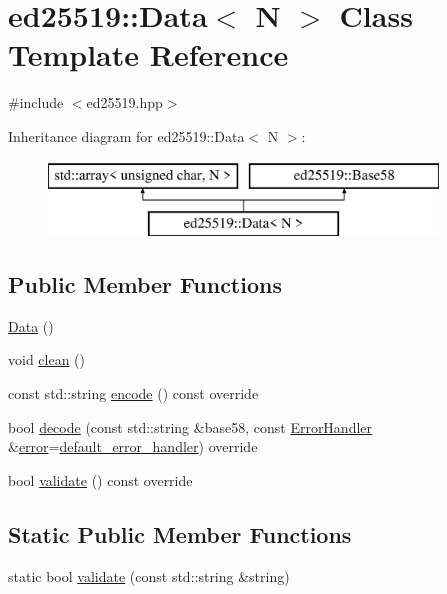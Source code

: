 \hypertarget{classed25519_1_1_data}{}\section{ed25519\+:\+:Data$<$ N $>$ Class Template Reference}
\label{classed25519_1_1_data}


{\ttfamily \#include $<$ed25519.\+hpp$>$}

Inheritance diagram for ed25519\+:\+:Data$<$ N $>$\+:\begin{figure}[H]
\begin{center}
\leavevmode
\includegraphics[height=2.000000cm]{classed25519_1_1_data}
\end{center}
\end{figure}
\subsection*{Public Member Functions}
\begin{DoxyCompactItemize}
\item 
\mbox{\hyperlink{classed25519_1_1_data_a2c637587095d6527cd4136926fb8b452}{Data}} ()
\item 
void \mbox{\hyperlink{classed25519_1_1_data_a65d5eba2b3c68f68001ef4d32645f9d9}{clean}} ()
\item 
const std\+::string \mbox{\hyperlink{classed25519_1_1_data_a2dc2e23b950a10b168d7509a63ffca53}{encode}} () const override
\item 
bool \mbox{\hyperlink{classed25519_1_1_data_a281d932d3c3fe7fd40ce86ea7eff559b}{decode}} (const std\+::string \&base58, const \mbox{\hyperlink{namespaceed25519_a6ba572942b3c18591fc869d52a6b16e6}{Error\+Handler}} \&\mbox{\hyperlink{namespaceed25519_ac93d0b5156eaca22197055e902920bc4}{error}}=\mbox{\hyperlink{namespaceed25519_a7c7bb6ed17541162959c33ed3e3b15fb}{default\+\_\+error\+\_\+handler}}) override
\item 
bool \mbox{\hyperlink{classed25519_1_1_data_ac365c9862b45379c677449b622c74da5}{validate}} () const override
\end{DoxyCompactItemize}
\subsection*{Static Public Member Functions}
\begin{DoxyCompactItemize}
\item 
static bool \mbox{\hyperlink{classed25519_1_1_data_ade9c93cb08f9d60aa45e75821ed1bcbe}{validate}} (const std\+::string \&string)
\end{DoxyCompactItemize}


